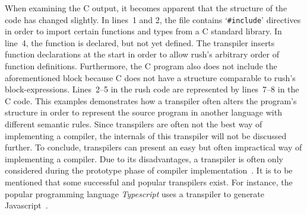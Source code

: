 When examining the C output, it becomes apparent that the structure of the code has changed slightly.
In lines~1 and 2, the file contains `\texttt{\#include}' directives in order to import certain functions and types from a C standard library.
In line~4, the  function is declared, but not yet defined.
The transpiler inserts function declarations at the start in order to allow rush's arbitrary order of function definitions.
Furthermore, the C program also does not include the aforementioned block because C does not have a structure comparable to rush's block-expressions.
Lines~2--5 in the rush code are represented by lines~7--8 in the C code.
This examples demonstrates how a transpiler often alters the program's structure in order to represent the source program in another language with different semantic rules.
Since transpilers are often not the best way of implementing a compiler, the internals of this transpiler will not be discussed further.
To conclude, transpilers can present an easy but often impractical way of implementing a compiler.
Due to its disadvantages, a transpiler is often only considered during the prototype phase of compiler implementation~\cite[p.~5]{Jeffery2021}.
It is to be mentioned that some successful and popular transpilers exist.
For instance, the popular programming language \emph{Typescript} uses a transpiler to generate Javascript~\cite[Chapter~2]{Cherny2019-rd}.
